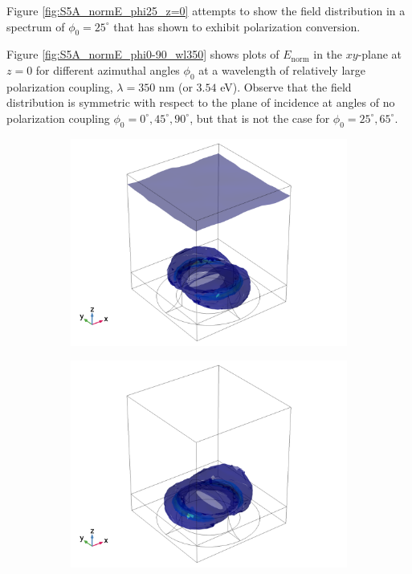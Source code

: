 Figure \ref{fig:S5A_normE_phi25_z=0} attempts to show the field distribution in a spectrum of $\phi_0=25^\circ$ that has shown to exhibit polarization conversion. 

Figure \ref{fig:S5A_normE_phi0-90_wl350} shows plots of $E_\text{norm}$ in the $xy$-plane at $z=0$ for different azimuthal angles $\phi_0$ at a wavelength of relatively large polarization coupling, $\lambda=350$ nm (or $3.54$ eV). Observe that the field distribution is symmetric with respect to the plane of incidence at angles of no polarization coupling $\phi_0=0^\circ, 45^\circ, 90^\circ$, but that is not the case for $\phi_0=25^\circ, 65^\circ$.


\begin{figure}[h!]
    \begin{subfigure}{0.5\textwidth}
        \centering
        \includegraphics[width=\linewidth, trim=0.4cm 0 1.5cm 0, clip]{figures/ch4/S5A/FieldDistribution/isosurface/Sample5A_nomE_wl620_phi0_TE.png}
    \end{subfigure}
    \begin{subfigure}{0.5\textwidth}
        \centering
        \includegraphics[width=\linewidth, trim=0.6cm 0 1.6cm 0, clip]{figures/ch4/S5A/FieldDistribution/isosurface/Sample5A_nomE_wl620_phi0_TM.png}

\end{subfigure}
\end{figure}
